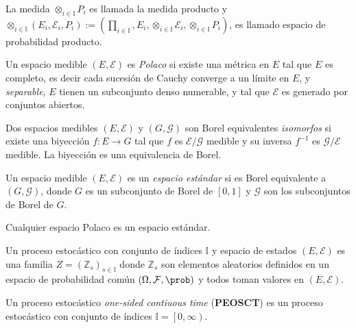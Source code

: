 La medida $\otimes_{i\in\mathbb{I}}P_{i}$ es llamada la medida producto y $\otimes_{i\in\mathbb{I}}\left(E_{i},\mathcal{E}_{i},P_{i}\right):=\left(\prod_{i\in\mathbb{I}},E_{i},\otimes_{i\in\mathbb{I}}\mathcal{E}_{i},\otimes_{i\in\mathbb{I}}P_{i}\right)$, es llamado espacio de probabilidad producto.


\begin{Def}
Un espacio medible $\left(E,\mathcal{E}\right)$ es \textit{Polaco} si existe una m\'etrica en $E$ tal que $E$ es completo, es decir cada sucesi\'on de Cauchy converge a un l\'imite en $E$, y \textit{separable}, $E$ tienen un subconjunto denso numerable, y tal que $\mathcal{E}$ es generado por conjuntos abiertos.
\end{Def}


\begin{Def}
Dos espacios medibles $\left(E,\mathcal{E}\right)$ y $\left(G,\mathcal{G}\right)$ son Borel equivalentes \textit{isomorfos} si existe una biyecci\'on $f:E\rightarrow G$ tal que $f$ es $\mathcal{E}/\mathcal{G}$ medible y su inversa $f^{-1}$ es $\mathcal{G}/\mathcal{E}$ medible. La biyecci\'on es una equivalencia de Borel.
\end{Def}

\begin{Def}
Un espacio medible  $\left(E,\mathcal{E}\right)$ es un \textit{espacio est\'andar} si es Borel equivalente a $\left(G,\mathcal{G}\right)$, donde $G$ es un subconjunto de Borel de $\left[0,1\right]$ y $\mathcal{G}$ son los subconjuntos de Borel de $G$.
\end{Def}

\begin{Note}
Cualquier espacio Polaco es un espacio est\'andar.
\end{Note}


\begin{Def}
Un proceso estoc\'astico con conjunto de \'indices $\mathbb{I}$ y espacio de estados $\left(E,\mathcal{E}\right)$ es una familia $Z=\left(\mathbb{Z}_{s}\right)_{s\in\mathbb{I}}$ donde $\mathbb{Z}_{s}$ son elementos aleatorios definidos en un espacio de probabilidad com\'un $\left(\Omega,\mathcal{F},\prob\right)$ y todos toman valores en $\left(E,\mathcal{E}\right)$.
\end{Def}

\begin{Def}
Un proceso estoc\'astico \textit{one-sided contiuous time} (\textbf{PEOSCT}) es un proceso estoc\'astico con conjunto de \'indices $\mathbb{I}=\left[0,\infty\right)$.
\end{Def}


